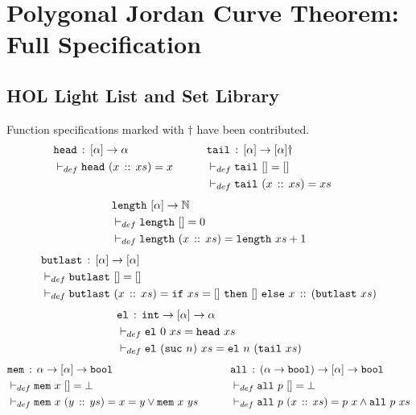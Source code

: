 \chapter{Polygonal Jordan Curve Theorem: Full Specification}
\label{app:JordanVerification}
\section{HOL Light List and Set Library}
Function specifications marked with $\dag$ have been contributed.
\begin{align*}
  & \texttt{head}\,:\,[\alpha] \rightarrow \alpha &\qquad
  & \texttt{tail}\,:\,[\alpha] \rightarrow [\alpha]\dag\\
  & \vdash_{def}\texttt{head}\ (x\,::\,xs) = x &\qquad
  & \vdash_{def}\texttt{tail}\ [] = []\\
  &&&\vdash_{def}\texttt{tail}\ (x\,::\,xs) = xs &\qquad
\end{align*}
\begin{align*}
  & \texttt{length}\ [\alpha]\rightarrow \mathbb{N}\\
  & \vdash_{def}\texttt{length}\ [] = 0\\
  & \vdash_{def}\texttt{length}\ (x\,::\,xs) = \texttt{length}\ xs + 1
\end{align*}
\begin{align*}
  &\code{butlast}\,:\,[\alpha] \rightarrow [\alpha]\\
  &\vdash_{def}\code{butlast}\ [] = []\\
  &\vdash_{def}\code{butlast}\ (\cons{x}{xs}) = \code{if}\ xs=[]\ \code{then}\ []\ \code{else}\ \cons{x}{(\code{butlast}\ xs)}
\end{align*}
\begin{align*}
  &\code{el}\,:\,\code{int} \rightarrow [\alpha] \rightarrow \alpha\\
  &\vdash_{def}\code{el}\ 0\ xs = \code{head}\ xs\\
  &\vdash_{def}\code{el}\ (\code{suc}\ n)\ xs = \code{el}\ n\ (\code{tail}\ xs)
\end{align*}
\begin{align*}
  & \texttt{mem}\,:\,\alpha \rightarrow [\alpha] \rightarrow \texttt{bool} &\qquad
  & \texttt{all}\,:\,(\alpha\rightarrow\texttt{bool}) \rightarrow [\alpha] \rightarrow \texttt{bool}\\
  & \vdash_{def}\texttt{mem}\ x\ [] = \bot &\qquad
  & \vdash_{def}\texttt{all}\ p\ [] = \bot\\
  & \vdash_{def}\texttt{mem}\ x\ (y\,::\,ys) = x = y \vee \texttt{mem}\ x\ ys &\qquad
  & \vdash_{def}\texttt{all}\ p\ (x\,::\,xs) = p\ x \wedge \texttt{all}\ p\ xs   
\end{align*}
